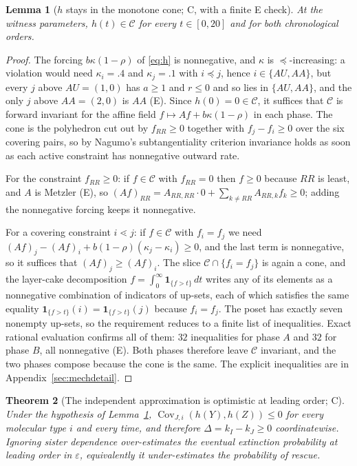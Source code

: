 \documentclass[11pt]{article}
\newtheorem{theorem}{Theorem}[section]
\newtheorem{lemma}[theorem]{Lemma}
\theoremstyle{remark}
\newcommand{\one}{\mathbf 1}
\newcommand{\eps}{\varepsilon}
\newcommand{\Cov}{\operatorname{Cov}}
\begin{document}
\begin{lemma}[$h$ stays in the monotone cone; C, with a finite E check]
\label{lem:cone}
At the witness parameters, $h(t)\in\mathcal C$ for every $t\in[0,20]$ and for both
chronological orders.
\end{lemma}

\begin{proof}
The forcing $b\kappa(1-\rho)$ of \eqref{eq:h} is nonnegative, and $\kappa$ is
$\preceq$-increasing: a violation would need $\kappa_i=.4$ and $\kappa_j=.1$ with
$i\preceq j$, hence $i\in\{AU,AA\}$, but every $j$ above $AU=(1,0)$ has $a\ge1$
and $r\le0$ and so lies in $\{AU,AA\}$, and the only $j$ above $AA=(2,0)$ is
$AA$ \textup{(E)}. Since $h(0)=0\in\mathcal C$, it suffices that
$\mathcal C$ is forward invariant for the affine field $f\mapsto Af+b\kappa(1-\rho)$
in each phase. The cone is the polyhedron cut out by $f_{RR}\ge0$ together with
$f_j-f_i\ge0$ over the six covering pairs, so by Nagumo's subtangentiality
criterion invariance holds as soon as each active constraint has nonnegative
outward rate.

For the constraint $f_{RR}\ge0$: if $f\in\mathcal C$ with $f_{RR}=0$ then $f\ge0$
because $RR$ is least, and $A$ is Metzler \textup{(E)}, so
$(Af)_{RR}=A_{RR,RR}\cdot0+\sum_{k\ne RR}A_{RR,k}f_k\ge0$; adding the nonnegative
forcing keeps it nonnegative.

For a covering constraint $i\lessdot j$: if $f\in\mathcal C$ with $f_i=f_j$ we need
$(Af)_j-(Af)_i+b(1-\rho)(\kappa_j-\kappa_i)\ge0$, and the last term is
nonnegative, so it suffices that $(Af)_j\ge(Af)_i$. The slice
$\mathcal C\cap\{f_i=f_j\}$ is again a cone, and the layer-cake decomposition
$f=\int_0^\infty\one_{\{f>t\}}\,dt$ writes any of its elements as a nonnegative
combination of indicators of up-sets, each of which satisfies the same equality
$\one_{\{f>t\}}(i)=\one_{\{f>t\}}(j)$ because $f_i=f_j$. The poset has exactly
seven nonempty up-sets, so the requirement reduces to a finite list of
inequalities. Exact rational evaluation confirms all of them: $32$ inequalities
for phase $A$ and $32$ for phase $B$, all nonnegative \textup{(E)}. Both phases
therefore leave $\mathcal C$ invariant, and the two phases compose because the cone
is the same. The explicit inequalities are in Appendix~\ref{sec:mechdetail}.
\end{proof}

\begin{theorem}[The independent approximation is optimistic at leading order; C]
\label{thm:sign}
Under the hypothesis of Lemma~\ref{lem:cone},
$\Cov_{J,i}(h(Y),h(Z))\le0$ for every molecular type $i$ and every time, and
therefore $\Delta=k_I-k_J\ge0$ coordinatewise. Ignoring sister dependence
over-estimates the eventual extinction probability at leading order in $\eps$,
equivalently it under-estimates the probability of rescue.
\end{theorem}
\end{document}
